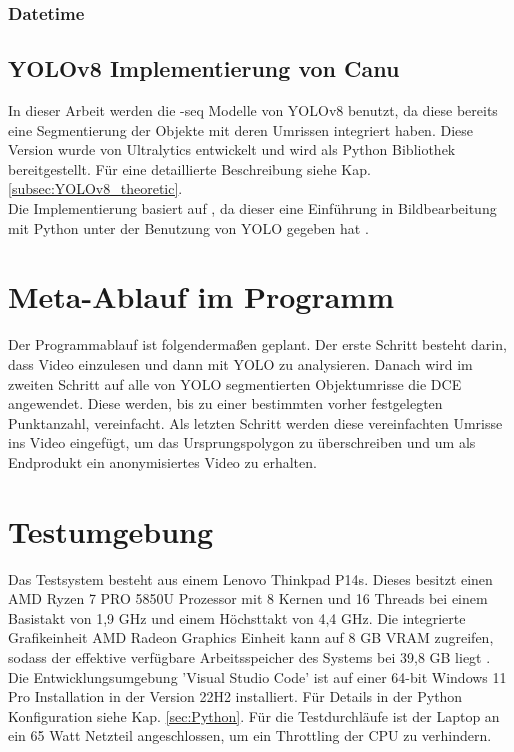 		\subsubsection*{Datetime}{
		}
		\subsection{YOLOv8 Implementierung von Canu}
		{ \label{YOLOv8_canu}
		In dieser Arbeit werden die \glqq-seq\grqq{} Modelle von YOLOv8 benutzt, da diese bereits eine Segmentierung der Objekte mit deren Umrissen integriert haben. Diese Version wurde von Ultralytics entwickelt und wird als Python Bibliothek bereitgestellt. Für eine detaillierte Beschreibung siehe Kap. \ref{subsec:YOLOv8_theoretic}. \\
		Die Implementierung basiert auf \citeauthor{Canu_pysource}, da dieser eine Einführung in Bildbearbeitung mit Python unter der Benutzung von YOLO gegeben hat \citep{Canu_pysource}.
		}


	
	\section{Meta-Ablauf im Programm}{
	Der Programmablauf ist folgendermaßen geplant. Der erste Schritt besteht darin, dass Video einzulesen und dann mit YOLO zu analysieren. Danach wird im zweiten Schritt auf alle von YOLO segmentierten Objektumrisse die DCE angewendet. Diese werden, bis zu einer bestimmten vorher festgelegten Punktanzahl, vereinfacht. Als letzten Schritt werden diese vereinfachten Umrisse ins Video eingefügt, um das Ursprungspolygon zu überschreiben und um als Endprodukt ein anonymisiertes Video zu erhalten.

	\section{Testumgebung}{ \label{sec:testumgebung}
	Das Testsystem besteht aus einem Lenovo Thinkpad P14s. Dieses besitzt einen AMD Ryzen 7 PRO 5850U Prozessor mit 8 Kernen und 16 Threads bei einem Basistakt von 1,9 GHz und einem Höchsttakt von 4,4 GHz. Die integrierte Grafikeinheit AMD Radeon Graphics Einheit kann auf 8 GB VRAM zugreifen, sodass der effektive verfügbare Arbeitsspeicher des Systems bei 39,8 GB liegt \citep{PSREF21}. Die Entwicklungsumgebung 'Visual Studio Code' ist auf einer 64-bit Windows 11 Pro Installation in der Version 22H2 installiert. Für Details in der Python Konfiguration siehe Kap. \ref{sec:Python}. Für die Testdurchläufe ist der Laptop an ein 65 Watt Netzteil angeschlossen, um ein Throttling der CPU zu verhindern.
}

	}





